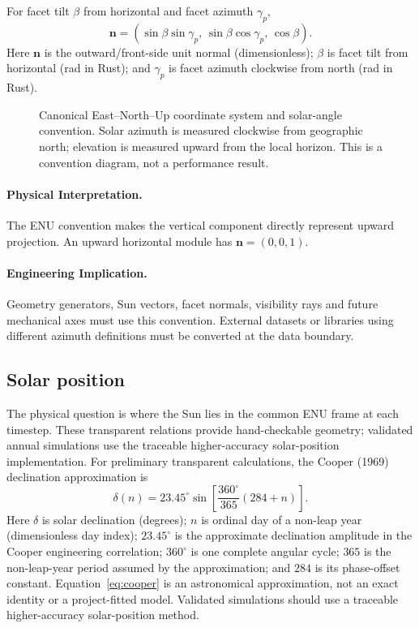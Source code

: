 \documentclass[11pt,a4paper]{article}
\begin{document}
For facet tilt \(\beta\) from horizontal and facet azimuth \(\gamma_p\),
\begin{equation}
\mathbf n=
\left(
\sin\beta\sin\gamma_p,\,
\sin\beta\cos\gamma_p,\,
\cos\beta
\right).
\label{eq:facet-normal-enu}
\end{equation}
Here \(\mathbf n\) is the outward/front-side unit normal (dimensionless); \(\beta\) is facet tilt from horizontal (rad in Rust); and \(\gamma_p\) is facet azimuth clockwise from north (rad in Rust).

\begin{figure}[htbp]
\centering

\caption{Canonical East--North--Up coordinate system and solar-angle convention. Solar azimuth is measured clockwise from geographic north; elevation is measured upward from the local horizon. This is a convention diagram, not a performance result.}
\label{fig:enu-convention}
\end{figure}

\paragraph{Physical Interpretation.}
The ENU convention makes the vertical component directly represent upward projection. An upward horizontal module has \(\mathbf n=(0,0,1)\).

\paragraph{Engineering Implication.}
Geometry generators, Sun vectors, facet normals, visibility rays and future mechanical axes must use this convention. External datasets or libraries using different azimuth definitions must be converted at the data boundary.

\subsection{Solar position}
The physical question is where the Sun lies in the common ENU frame at each timestep. These transparent relations provide hand-checkable geometry; validated annual simulations use the traceable higher-accuracy solar-position implementation.
For preliminary transparent calculations, the Cooper (1969) declination approximation is
\begin{equation}
\delta(n)=23.45^{\circ}\sin\!\left[\frac{360^{\circ}}{365}(284+n)\right].
\label{eq:cooper}
\end{equation}
Here $\delta$ is solar declination (degrees); $n$ is ordinal day of a non-leap year (dimensionless day index); $23.45^{\circ}$ is the approximate declination amplitude in the Cooper engineering correlation; $360^{\circ}$ is one complete angular cycle; $365$ is the non-leap-year period assumed by the approximation; and $284$ is its phase-offset constant. Equation~\eqref{eq:cooper} is an astronomical approximation, not an exact identity or a project-fitted model. Validated simulations should use a traceable higher-accuracy solar-position method.
\end{document}
